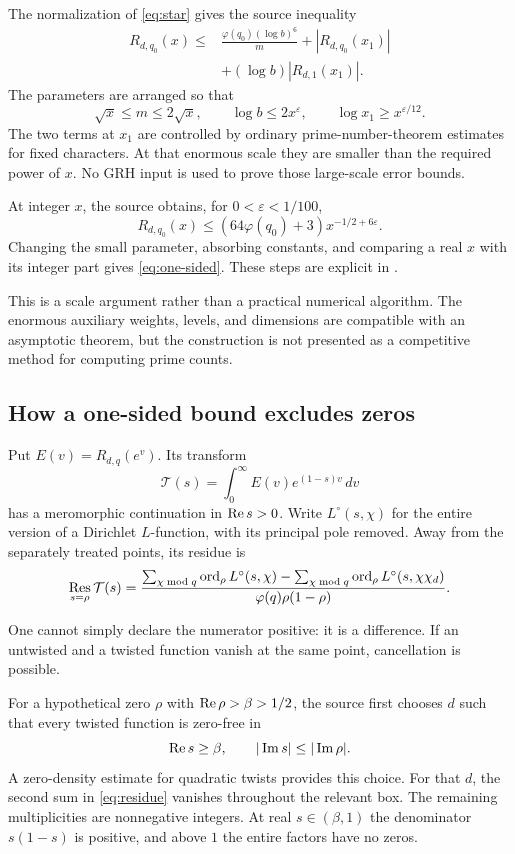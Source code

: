 The normalization of \eqref{eq:star} gives the source inequality
\begin{align}\label{eq:normalized}
R_{d,q_0}(x)\le {}&
\frac{\varphi(q_0)(\log b)^6}{m}
+|R_{d,q_0}(x_1)|\\
&+(\log b)|R_{d,1}(x_1)|.\nonumber
\end{align}
The parameters are arranged so that
\[
\sqrt{x}\le m\le2\sqrt{x},
\qquad
\log b\le2x^\varepsilon,
\qquad
\log x_1\ge x^{\varepsilon/12}.
\]
The two terms at \(x_1\) are controlled by ordinary prime-number-theorem estimates for fixed characters. At that enormous scale they are smaller than the required power of \(x\). No GRH input is used to prove those large-scale error bounds.

At integer \(x\), the source obtains, for \(0<\varepsilon<1/100\),
\[
R_{d,q_0}(x)\le
(64\varphi(q_0)+3)x^{-1/2+6\varepsilon}.
\]
Changing the small parameter, absorbing constants, and comparing a real \(x\) with its integer part gives \eqref{eq:one-sided}. These steps are explicit in .

This is a scale argument rather than a practical numerical algorithm. The enormous auxiliary weights, levels, and dimensions are compatible with an asymptotic theorem, but the construction is not presented as a competitive method for computing prime counts.

\subsection{How a one-sided bound excludes zeros}

Put \(E(v)=R_{d,q}(e^v)\). Its transform
\[
\mathcal T(s)=\int_0^\infty E(v)e^{(1-s)v}\,dv
\]
has a meromorphic continuation in \(\operatorname{Re} s>0\). Write \(L^\circ(s,\chi)\) for the entire version of a Dirichlet \(L\)-function, with its principal pole removed. Away from the separately treated points, its residue is
\begin{equation}\label{eq:residue}
\operatorname*{Res}_{s=\rho}\mathcal T(s)
=
\frac{
\sum_{\chi\bmod q}\operatorname{ord}_\rho L^\circ(s,\chi)
-
\sum_{\chi\bmod q}\operatorname{ord}_\rho L^\circ(s,\chi\chi_d)}
{\varphi(q)\rho(1-\rho)}.
\end{equation}

One cannot simply declare the numerator positive: it is a difference. If an untwisted and a twisted function vanish at the same point, cancellation is possible.

For a hypothetical zero \(\rho\) with \(\operatorname{Re}\rho>\beta>1/2\), the source first chooses \(d\) such that every twisted function is zero-free in
\[
\operatorname{Re} s\ge\beta,\qquad |\operatorname{Im} s|\le|\operatorname{Im}\rho|.
\]
A zero-density estimate for quadratic twists provides this choice. For that \(d\), the second sum in \eqref{eq:residue} vanishes throughout the relevant box. The remaining multiplicities are nonnegative integers. At real \(s\in(\beta,1)\) the denominator \(s(1-s)\) is positive, and above \(1\) the entire factors have no zeros.

